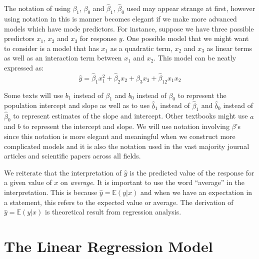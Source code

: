 \begin{nt}
The notation of using $\beta_{1}$, $\beta_{0}$
and $\hat{\beta}_{1}$, $\hat{\beta}_{0}$
used may appear strange at first, however using notation in
this is manner becomes elegant if we make more advanced models 
which have mode predictors.
For instance, suppose we have three possible predictors 
$x_{1}$, $x_{2}$ and $x_{3}$ for response $y$. 
One possible model that we might want to consider is a model
that has $x_{1}$ as a quadratic term,
$x_{2}$ and $x_{3}$ as linear terms
as well as an interaction term between $x_{1}$ and $x_{2}$.
This model can be neatly expressed as:
	\begin{equation}
	\hat{y} = 	\hat{\beta}_{1} x_{1}^{2} 
			+ \hat{\beta}_{2} x_{2}
			+ \hat{\beta}_{3} x_{3}
			+ \hat{\beta}_{12} x_{1} x_{2}
	\end{equation}
\end{nt}

\begin{nt}
Some texts will use $b_{1}$ instead of $\beta_{1}$
and $b_{0}$ instead of $\beta_{0}$ to represent the population 
intercept and slope as well as to use
$\hat{b}_{1}$ instead of $\hat{\beta}_{1}$
and $\hat{b}_{0}$ instead of $\hat{\beta}_{0}$
to represent estimates of the slope and intercept.
Other textbooks might use $a$ and $b$ to represent the 
intercept and slope.
We will use notation involving $\beta$'s since this notation is
more elegant and meaningful when we construct more
complicated models and it is also the notation used 
in the vast majority journal articles and scientific papers
across all fields.
\end{nt}


\begin{nt}
We reiterate that the interpretation of $\hat{y}$ is the
predicted value of the response 
for a given value of $x$ on \textit{average}.
It is important to use the word ``average'' in the interpretation.
This is because $\hat{y} = \mathbb{E}(y|x)$ and when we have
an expectation in a statement, this refers to the expected value
or average.
The derivation of $\hat{y} = \mathbb{E}(y|x)$ is theoretical result 
from regression analysis. 
\end{nt}




\section{The Linear Regression Model}
\label{sectionConstructingLinModel}

